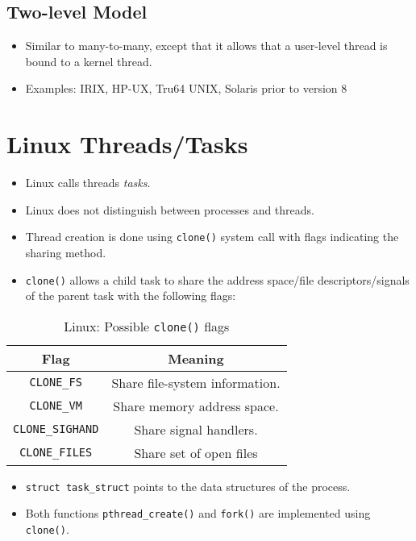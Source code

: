 		\subsection{Two-level Model}
			\begin{itemize}
				\item Similar to many-to-many, except that it allows that a user-level thread is bound to a kernel thread.
				\item Examples: IRIX, HP-UX, Tru64 UNIX, Solaris prior to version 8
			\end{itemize}

	\section{Linux Threads/Tasks}
		\begin{itemize}
			\item Linux calls threads \textit{tasks}.
			\item Linux does not distinguish between processes and threads.
			\item Thread creation is done using \texttt{clone()} system call with flags indicating the sharing method.
			\item \texttt{clone()} allows a child task to share the address space/file descriptors/signals of the parent task with the following flags:
		\end{itemize}
		\begin{table}[H]
			\centering
			\begin{tabular}{c | c}
				Flag                    & Meaning                        \\ \hline
				\texttt{CLONE\_FS}      & Share file-system information. \\
				\texttt{CLONE\_VM}      & Share memory address space.    \\
				\texttt{CLONE\_SIGHAND} & Share signal handlers.         \\
				\texttt{CLONE\_FILES}   & Share set of open files
			\end{tabular}
			\caption{Linux: Possible \texttt{clone()} flags}
		\end{table}
		\begin{itemize}
			\item \texttt{struct task\_struct} points to the data structures of the process.
			\item Both functions \texttt{pthread\_create()} and \texttt{fork()} are implemented using \texttt{clone()}.
		\end{itemize}

